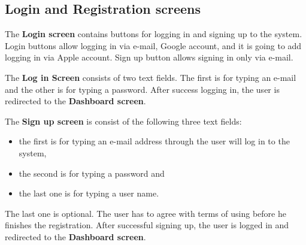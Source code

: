 \subsection{Login and Registration screens}\label{subsec:login-screen}
The \textbf{Login screen} contains buttons for logging in and signing up to the system.
Login buttons allow logging in via e-mail, Google account, and it is going to add logging in via Apple account.
Sign up button allows signing in only via e-mail.

The \textbf{Log in Screen} consists of two text fields.
The first is for typing an e-mail and the other is for typing a password.
After success logging in, the user is redirected to the \textbf{Dashboard screen}.

The \textbf{Sign up screen} is consist of the following three text fields:
\begin{itemize}
    \item the first is for typing an e-mail address through the user will log in to the system,
    \item the second is for typing a password and
    \item the last one is for typing a user name.
\end{itemize}
The last one is optional.
The user has to agree with terms of using before he finishes the registration.
After successful signing up, the user is logged in and redirected to the \textbf{Dashboard screen}.
